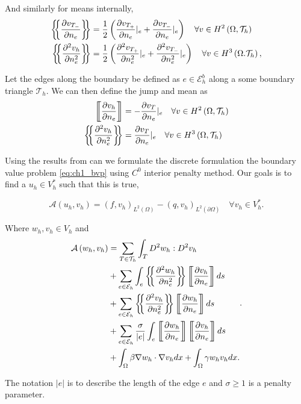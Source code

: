 And similarly for means internally,
\[
    \begin{split}
\mean{ \frac{\partial v_{T_{-}}}{\partial n_{e} } } &= \frac{1}{2} \left( \frac{\partial v_{T_{+}}}{\partial n_{e} }
|_{e} +  \frac{\partial v_{T_{-}}}{\partial n_{e} } |_{e}  \right) \quad  \forall v \in H^2\left( \Omega , \mathcal{T}
_{h} \right) \\
    \mean{ \frac{\partial ^2 v_{h}}{\partial n_{e}^2 } } &= \frac{1}{2} \left( \frac{\partial ^2 v_{T_{+}}}{\partial
    n_{e}^2  } |_{e} + \frac{\partial ^2 v_{T_{-}}}{\partial n_{e}^2  } |_{e}    \right) \quad \forall v \in  H^3\left( \Omega .
\mathcal{T}_{h}  \right), \\
    \end{split}
\]

Let the edges along the boundary be defined as $e \in  \mathcal{E} _{h}^{b}$ along a some boundary triangle $\mathcal{T}
_{h}$. We can then define the jump and mean as \[
\begin{split}
    \jump{ \frac{\partial v_{h} }{\partial n_{e} } } & = -\frac{\partial v_{T}}{\partial  n_{e}} |_{e} \quad \forall v \in
    H^2\left( \Omega , \mathcal{T}_{h}  \right) \\
    \mean{ \frac{\partial ^2 v_{h}}{\partial n_{e}^2 } } & = \frac{\partial v_{T}}{\partial  n_{e}} |_{e} \quad \forall v \in
    H^3\left( \Omega  , \mathcal{T}_{h}  \right)
\end{split}
\]

Using the results from \cite{gu2012c0} can we formulate the discrete formulation the boundary value problem
\eqref{eq:ch1_bvp} using $C^{0}$ interior penalty method. Our goals is to find a $u_{h} \in V_{h}^{*} $ such that this
is true,

\begin{equation}
\label{eq:C0-methoda}
\mathcal{A} \left( u_{h}, v_{h}  \right) = \left( f, v_{h} \right)_{L^{2}\left( \Omega  \right)} - \left( q, v_{h}
\right) _{L^{2}\left( \partial \Omega  \right)} \quad  \forall v_{h} \in V_{h}^{*}
.\end{equation}

Where $w_{h}, v_{h} \in  V_{h}$ and
\begin{equation}
\label{eq:C0-methodb}
\begin{split}
    \mathcal{A} \left( w_{h}, v_{h} \right) &=  \sum_{T \in \mathcal{T} _{h}}^{} \int_{T}^{} D^2 w_{h} : D^2 v_{h}  \\
    & + \sum_{e \in  \mathcal{E} _{h}}^{} \int_{e}^{ } \mean{ \frac{\partial ^2 w _{h}}{\partial n_{e}^2 } } \jump{
    \frac{\partial v_{h}}{\partial  n_{e}} }  ds \\
    & + \sum_{e \in \mathcal{E} _{h}}^{} \mean{ \frac{\partial ^2
v_{h}}{\partial n_{e }^2 } } \jump{ \frac{\partial w_{h}}{\partial n_{e}} }  ds \\
 &  + \sum_{e \in \mathcal{E} _{h}}^{} \frac{\sigma }{\left\lvert e \right\rvert } \int_{e}^{} \jump{ \frac{\partial
 w_{h}}{\partial n_{e}}} \jump{ \frac{\partial v_{h}}{\partial n_{e}} } ds \\
 & + \int_{\Omega }^{}  \beta \nabla w_{h} \cdot \nabla v_{h} dx + \int_{\Omega }^{} \gamma w_{h} v_{h} dx .
\end{split}
.\end{equation}

The notation $\left\lvert e \right\rvert $ is to describe the length of the edge $e$ and $\sigma  \ge  1$ is a penalty
parameter.

